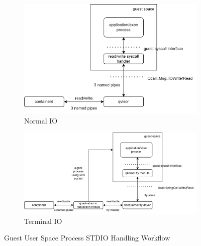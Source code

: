 \begin{figure}[ht] 
    \begin{subfigure}[b]{0.5\linewidth}
      \centering
      \includegraphics[width=0.9\linewidth]{images/normorl_io.png} 
      \caption{Normal IO} 
      \label{fig1:a} 
      \vspace{4ex}
    \end{subfigure}%
    \begin{subfigure}[b]{0.5\linewidth}
      \centering
      \includegraphics[width=0.9\linewidth]{images/termianl_workflow.png} 
      \caption{Terminal IO} 
      \label{fig1:b} 
      \vspace{4ex}
    \end{subfigure} 
    \caption{Guest User Space Process STDIO Handling Workflow}
    \label{fig1} 
\end{figure}


